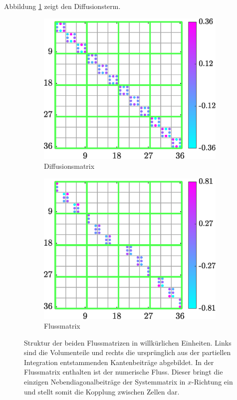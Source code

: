 Abbildung \ref{fig:matrix_L} zeigt den Diffusionsterm.
\begin{figure}
    \centering
    \begin{subfigure}[b]{0.475\textwidth}
        \centering
        \includegraphics[width=\textwidth]{plots/L_glob.eps}
        \caption[]%
        {{\small Diffusionsmatrix}}
        \label{fig:matrix_L}
    \end{subfigure}
    \hfill
    \begin{subfigure}[b]{0.475\textwidth}
        \centering
        \includegraphics[width=\textwidth]{plots/F_glob.eps}
        \caption[]%
        {{\small Flussmatrix}}
        \label{fig:matrix_F}
    \end{subfigure}
    \caption[]
    {Struktur der beiden Flussmatrizen in willkürlichen Einheiten. Links sind die Volumenteile und rechts die ursprünglich aus der partiellen Integration entstammenden Kantenbeiträge abgebildet. In der Flussmatrix enthalten ist der numerische Fluss. Dieser bringt die einzigen Nebendiagonalbeiträge der Systemmatrix in $x$-Richtung ein und stellt somit die Kopplung zwischen Zellen dar.}
\end{figure}
